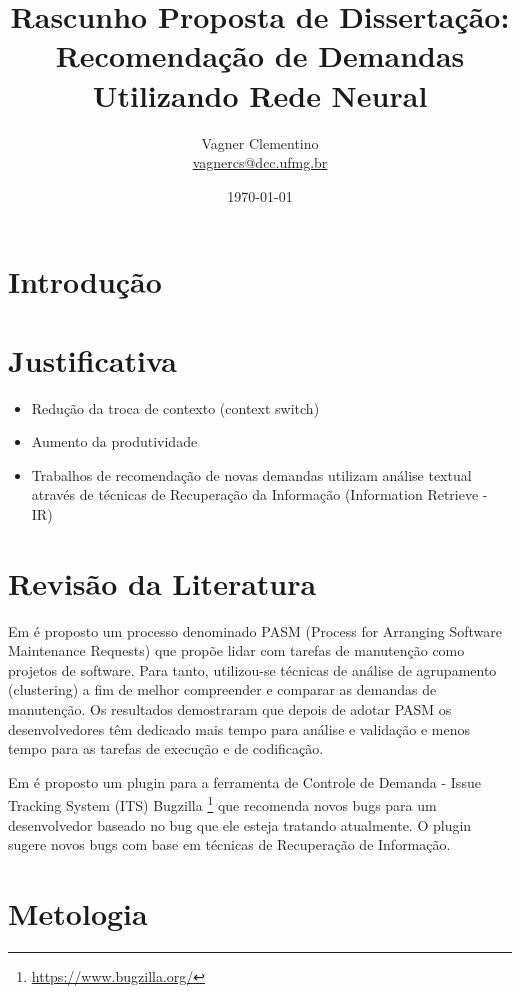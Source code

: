 \documentclass{article}
\title{Rascunho Proposta de Dissertação:\\
Recomendação de Demandas Utilizando Rede Neural
}
\author{Vagner Clementino \\
       \url{vagnercs@dcc.ufmg.br}}
\date{\today}
\begin{document}
\maketitle

\section{Introdução}
\label{sec:intro}

\section{Justificativa}
\label{sec:justificativa}

\begin{itemize}
\item Redução da troca de contexto (context switch)
\item Aumento da produtividade
\item Trabalhos de recomendação de novas demandas utilizam análise textual
  através de técnicas de Recuperação da Informação (Information Retrieve - IR)

\end{itemize}

\section{Revisão da Literatura}
\label{sec:revisao}

Em \cite{5741246} é proposto um processo denominado PASM (Process for Arranging
Software Maintenance Requests) que propõe lidar com tarefas de manutenção como
projetos de software. Para tanto, utilizou-se técnicas de análise de
agrupamento (clustering) a fim de melhor compreender e comparar as demandas de
manutenção. Os resultados demostraram que depois de adotar PASM os
desenvolvedores têm dedicado mais tempo para análise e validação e menos tempo
para as tarefas de execução e de codificação.

Em \cite{101186} é proposto um plugin para a ferramenta de Controle de Demanda -
Issue Tracking System (ITS) Bugzilla \footnote{\url{https://www.bugzilla.org/}}
que recomenda novos bugs para um desenvolvedor baseado no bug que ele esteja
tratando atualmente. O plugin sugere novos bugs com base em técnicas de
Recuperação de Informação\cite{baeza1999modern}.

\section{Metologia}
\label{sec:medotologia}
\end{document}
